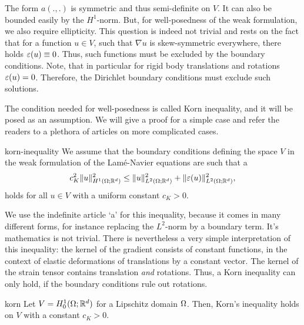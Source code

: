 \begin{intro}
  The form $a(.,.)$ is symmetric and thus semi-definite on $V$. It can
  also be bounded easily by the $H^1$-norm. But, for well-posedness of
  the weak formulation, we also require ellipticity. This question is
  indeed not trivial and rests on the fact that for a function
  $u\in V$, such that $\nabla u$ is skew-symmetric everywhere, there
  holds $\varepsilon(u)\equiv 0$. Thus, such functions must be excluded by
  the boundary conditions. Note, that in particular for rigid body
  translations and rotations $\varepsilon(u) = 0$. Therefore, the Dirichlet
  boundary conditions must exclude such solutions.
  
  The condition needed for well-posedness is called Korn inequality,
  and it will be posed as an assumption. We will give a proof for a
  simple case and refer the readers to a plethora of articles on more
  complicated cases.
\end{intro}

\begin{Assumption}{korn-inequality}
  We assume that the boundary conditions defining the space $V$ in the
  weak formulation of the Lamé-Navier equations are such that
  a 
  \begin{gather}
    \label{eq:mixedintro:korn}
    c_K^2 \lVert u\rVert_{H^1(\Omega;\mathbb R^d)}^2
    \le \lVert u\rVert_{L^2(\Omega;\mathbb R^d)}^2
    + \lVert\varepsilon(u)\rVert_{L^2(\Omega;\mathbb R^d)}^2,
  \end{gather}
  holds for all $u\in V$ with a uniform constant $c_K>0$.
\end{Assumption}

\begin{remark}
  We use the indefinite article `a' for this inequality, because it
  comes in many different forms, for instance replacing the $L^2$-norm
  by a boundary term. It's mathematics is not trivial. There is
  nevertheless a very simple interpretation of this inequality: the
  kernel of the gradient consists of constant functions, in the
  context of elastic deformations of translations by a constant
  vector. The kernel of the strain tensor contains translation
  \emph{and} rotations. Thus, a Korn inequality can only hold, if the
  boundary conditions rule out rotations.
\end{remark}

\begin{Lemma}{korn}
  Let $V = H^1_0(\Omega;\mathbb R^d)$ for a Lipschitz domain
  $\Omega$. Then, Korn's inequality holds on $V$ with a constant
  $c_K>0$.
\end{Lemma}

